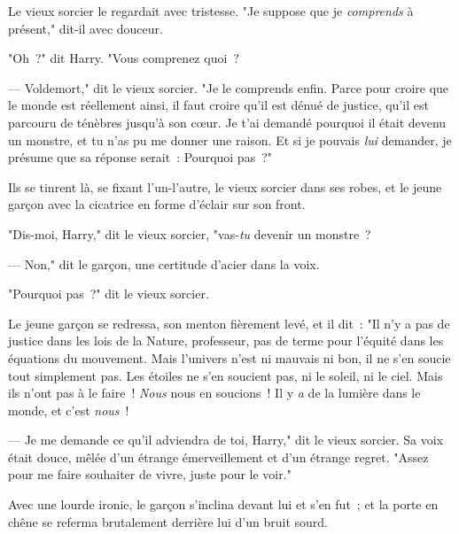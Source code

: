 Le vieux sorcier le regardait avec tristesse. "Je suppose que je \emph{comprends} à présent," dit-il avec douceur.

"Oh~?" dit Harry. "Vous comprenez quoi~?

--- Voldemort," dit le vieux sorcier. "Je le comprends enfin. Parce pour croire que le monde est réellement ainsi, il faut croire qu'il est dénué de justice, qu'il est parcouru de ténèbres jusqu'à son cœur. Je t'ai demandé pourquoi il était devenu un monstre, et tu n'as pu me donner une raison. Et si je pouvais \emph{lui} demander, je présume que sa réponse serait~: Pourquoi pas~?"

\later

Ils se tinrent là, se fixant l'un-l'autre, le vieux sorcier dans ses robes, et le jeune garçon avec la cicatrice en forme d'éclair sur son front.

"Dis-moi, Harry," dit le vieux sorcier, "vas-\emph{tu} devenir un monstre~?

--- Non," dit le garçon, une certitude d'acier dans la voix.

"Pourquoi pas~?" dit le vieux sorcier.

Le jeune garçon se redressa, son menton fièrement levé, et il dit~: "Il n'y a pas de justice dans les lois de la Nature, professeur, pas de terme pour l'équité dans les équations du mouvement. Mais l'univers n'est ni mauvais ni bon, il ne s'en soucie tout simplement pas. Les étoiles ne s'en soucient pas, ni le soleil, ni le ciel. Mais ils n'ont pas à le faire~! \emph{Nous} nous en soucions~! Il y \emph{a} de la lumière dans le monde, et c'est \emph{nous}~!

--- Je me demande ce qu'il adviendra de toi, Harry," dit le vieux sorcier. Sa voix était douce, mêlée d'un étrange émerveillement et d'un étrange regret. "Assez pour me faire souhaiter de vivre, juste pour le voir."

Avec une lourde ironie, le garçon s'inclina devant lui et s'en fut~; et la porte en chêne se referma brutalement derrière lui d'un bruit sourd. 

